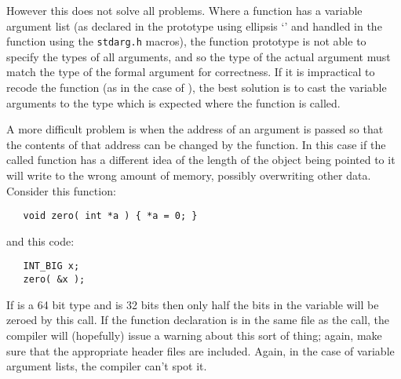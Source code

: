 \documentclass[twoside,11pt]{article}
\renewcommand{\_}{\texttt{\symbol{95}}}
\begin{document}
However this does not solve all problems.
Where a function has a variable argument list
(as declared in the prototype using ellipsis `'
and handled in the function using the {\tt stdarg.h} macros), 
the function prototype
is not able to specify the types of all arguments,
and so the type of the actual argument must match the type of
the formal argument for correctness.  If it is impractical
to recode the function (as in the case of ),
the best solution is to cast the variable arguments to the type
which is expected where the function is called.

A more difficult problem is when the address of an argument is
passed so that the contents of that address can be changed by
the function.  In this case if the called function has a
different idea of the length of the object being pointed to
it will write to the wrong amount of memory, possibly overwriting
other data.  Consider this function:
\begin{squote}
\begin{verbatim}
   void zero( int *a ) { *a = 0; }
\end{verbatim}
\end{squote}
and this code:
\begin{squote}
\begin{verbatim}
   INT_BIG x;
   zero( &x );
\end{verbatim}
\end{squote}
If \cc{INT\_BIG} is a 64 bit type and  is 32 bits
then only half the bits in the variable  will be zeroed by this call.
If the function declaration is in the same file as the call,
the compiler will (hopefully) issue a warning about this sort of thing; 
again, make sure that the appropriate header files are included.
Again, in the case of variable argument lists, the compiler can't spot it.
\end{document}
